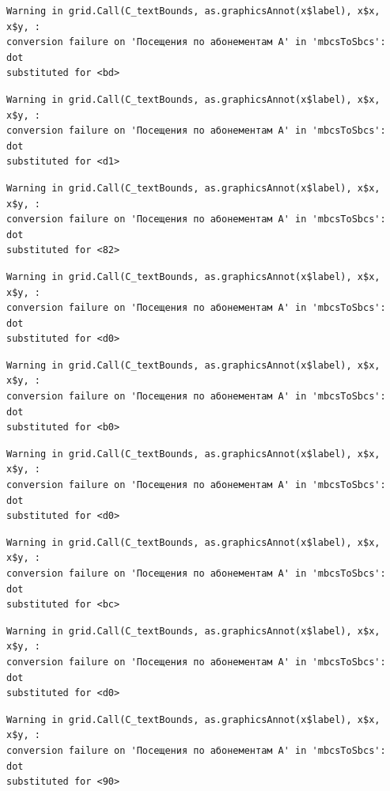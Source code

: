 \documentclass[
  letterpaper,
  DIV=11,
  numbers=noendperiod]{scrartcl}
\begin{document}
\begin{verbatim}
Warning in grid.Call(C_textBounds, as.graphicsAnnot(x$label), x$x, x$y, :
conversion failure on 'Посещения по абонементам А' in 'mbcsToSbcs': dot
substituted for <bd>
\end{verbatim}

\begin{verbatim}
Warning in grid.Call(C_textBounds, as.graphicsAnnot(x$label), x$x, x$y, :
conversion failure on 'Посещения по абонементам А' in 'mbcsToSbcs': dot
substituted for <d1>
\end{verbatim}

\begin{verbatim}
Warning in grid.Call(C_textBounds, as.graphicsAnnot(x$label), x$x, x$y, :
conversion failure on 'Посещения по абонементам А' in 'mbcsToSbcs': dot
substituted for <82>
\end{verbatim}

\begin{verbatim}
Warning in grid.Call(C_textBounds, as.graphicsAnnot(x$label), x$x, x$y, :
conversion failure on 'Посещения по абонементам А' in 'mbcsToSbcs': dot
substituted for <d0>
\end{verbatim}

\begin{verbatim}
Warning in grid.Call(C_textBounds, as.graphicsAnnot(x$label), x$x, x$y, :
conversion failure on 'Посещения по абонементам А' in 'mbcsToSbcs': dot
substituted for <b0>
\end{verbatim}

\begin{verbatim}
Warning in grid.Call(C_textBounds, as.graphicsAnnot(x$label), x$x, x$y, :
conversion failure on 'Посещения по абонементам А' in 'mbcsToSbcs': dot
substituted for <d0>
\end{verbatim}

\begin{verbatim}
Warning in grid.Call(C_textBounds, as.graphicsAnnot(x$label), x$x, x$y, :
conversion failure on 'Посещения по абонементам А' in 'mbcsToSbcs': dot
substituted for <bc>
\end{verbatim}

\begin{verbatim}
Warning in grid.Call(C_textBounds, as.graphicsAnnot(x$label), x$x, x$y, :
conversion failure on 'Посещения по абонементам А' in 'mbcsToSbcs': dot
substituted for <d0>
\end{verbatim}

\begin{verbatim}
Warning in grid.Call(C_textBounds, as.graphicsAnnot(x$label), x$x, x$y, :
conversion failure on 'Посещения по абонементам А' in 'mbcsToSbcs': dot
substituted for <90>
\end{verbatim}
\end{document}

